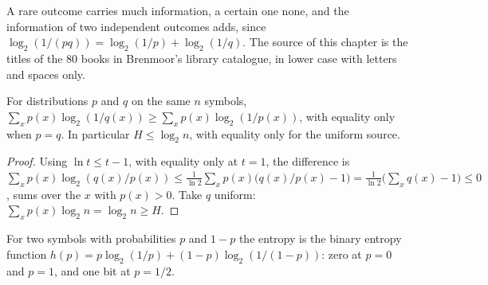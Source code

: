 A rare outcome carries much information, a certain one none, and the information of two independent outcomes adds, since $\log_2 (1/(pq)) = \log_2 (1/p) + \log_2 (1/q)$. The source of this chapter is the titles of the 80 books in Brenmoor's library catalogue, in lower case with letters and spaces only.

\label{lst:b3:information-and-codes:entropy}

\label{out:b3:information-and-codes:entropy}

\begin{theorem}\label{thm:b3:information-and-codes:gibbs}
For distributions $p$ and $q$ on the same $n$ symbols, $\sum_x p(x) \log_2 (1/q(x)) \ge \sum_x p(x) \log_2 (1/p(x))$, with equality only when $p = q$. In particular $H \le \log_2 n$, with equality only for the uniform source.
\end{theorem}

\begin{proof}
Using $\ln t \le t - 1$, with equality only at $t = 1$, the difference is $\sum_x p(x) \log_2 (q(x)/p(x)) \le \frac{1}{\ln 2} \sum_x p(x) \bigl(q(x)/p(x) - 1\bigr) = \frac{1}{\ln 2} \bigl(\sum_x q(x) - 1\bigr) \le 0$, sums over the $x$ with $p(x) > 0$. Take $q$ uniform: $\sum_x p(x) \log_2 n = \log_2 n \ge H$.
\end{proof}

For two symbols with probabilities $p$ and $1 - p$ the entropy is the binary entropy function $h(p) = p \log_2 (1/p) + (1 - p) \log_2 (1/(1 - p))$: zero at $p = 0$ and $p = 1$, and one bit at $p = 1/2$.

\begin{omfigure}
\par{}
\end{omfigure}

